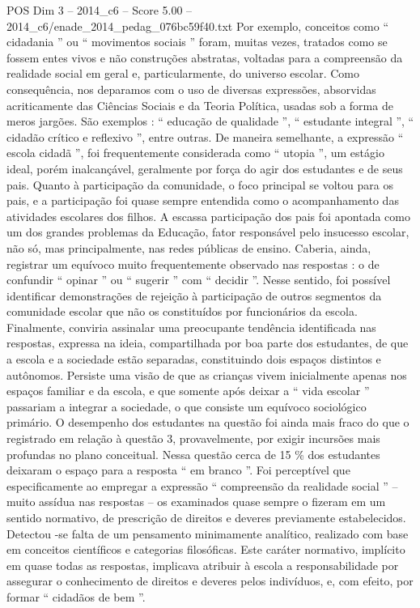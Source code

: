 \begin{textsample}{POS Dim 3 – 2014\_c6 – Score 5.00 – 2014\_c6/enade\_2014\_pedag\_076bc59f40.txt}
Por exemplo, conceitos como “ cidadania ” ou “ movimentos sociais ” foram, muitas vezes, tratados como se fossem entes vivos e não construções abstratas, voltadas para a compreensão da realidade social em geral e, particularmente, do universo escolar.
Como consequência, nos deparamos com o uso de diversas expressões, absorvidas acriticamente das Ciências Sociais e da Teoria Política, usadas sob a forma de meros jargões.
São exemplos : “ educação de qualidade ”, “ estudante integral ”, “ cidadão crítico e reflexivo ”, entre outras.
De maneira semelhante, a expressão “ escola cidadã ”, foi frequentemente considerada como “ utopia ”, um estágio ideal, porém inalcançável, geralmente por força do agir dos estudantes e de seus pais.
Quanto à participação da comunidade, o foco principal se voltou para os pais, e a participação foi quase sempre entendida como o acompanhamento das atividades escolares dos filhos.
A escassa participação dos pais foi apontada como um dos grandes problemas da Educação, fator responsável pelo insucesso escolar, não só, mas principalmente, nas redes públicas de ensino.
Caberia, ainda, registrar um equívoco muito frequentemente observado nas respostas : o de confundir “ opinar ” ou “ sugerir ” com “ decidir ”.
Nesse sentido, foi possível identificar demonstrações de rejeição à participação de outros segmentos da comunidade escolar que não os constituídos por funcionários da escola.
Finalmente, conviria assinalar uma preocupante tendência identificada nas respostas, expressa na ideia, compartilhada por boa parte dos estudantes, de que a escola e a sociedade estão separadas, constituindo dois espaços distintos e autônomos.
Persiste uma visão de que as crianças vivem inicialmente apenas nos espaços familiar e da escola, e que somente após deixar a “ vida escolar ” passariam a integrar a sociedade, o que consiste um equívoco sociológico primário.
O desempenho dos estudantes na questão foi ainda mais fraco do que o registrado em relação à questão 3, provavelmente, por exigir incursões mais profundas no plano conceitual.
Nessa questão cerca de 15 \% dos estudantes deixaram o espaço para a resposta “ em branco ”.
Foi perceptível que especificamente ao empregar a expressão “ compreensão da realidade social ” – muito assídua nas respostas – os examinados quase sempre o fizeram em um sentido normativo, de prescrição de direitos e deveres previamente estabelecidos.
Detectou -se falta de um pensamento minimamente analítico, realizado com base em conceitos científicos e categorias filosóficas.
Este caráter normativo, implícito em quase todas as respostas, implicava atribuir à escola a responsabilidade por assegurar o conhecimento de direitos e deveres pelos indivíduos, e, com efeito, por formar “ cidadãos de bem ”.

\end{textsample}
